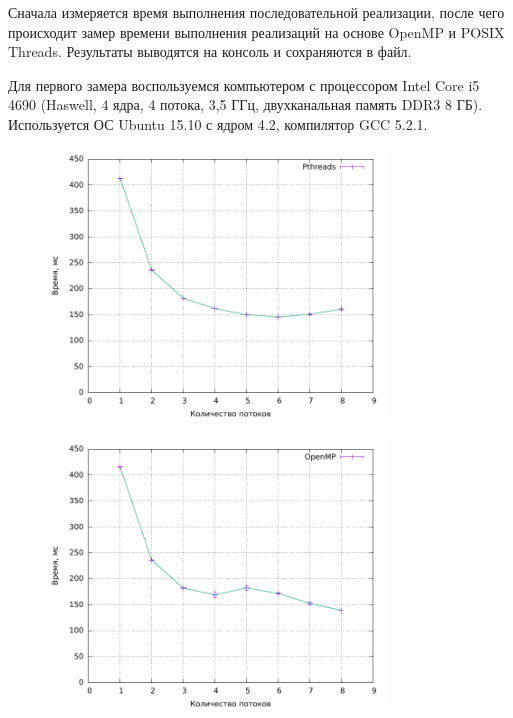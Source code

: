 

Сначала измеряется время выполнения последовательной реализации, после чего происходит замер времени выполнения реализаций на основе OpenMP и POSIX Threads. Результаты выводятся на консоль и сохраняются в файл.



Для первого замера воспользуемся компьютером с процессором Intel Core i5 4690 (Haswell, 4 ядра, 4 потока, 3,5 ГГц, двухканальная память DDR3 8 ГБ). Используется ОС Ubuntu 15.10 с ядром 4.2, компилятор GCC 5.2.1.

\begin{figure}[H]
	\centering
	\includegraphics[width=0.8\textwidth]{../plot_gcc/plotPth.pdf}
	\caption{}
\end{figure}

\begin{figure}[H]
	\centering
	\includegraphics[width=0.8\textwidth]{../plot_gcc/plotMp.pdf}
	\caption{}
\end{figure}

